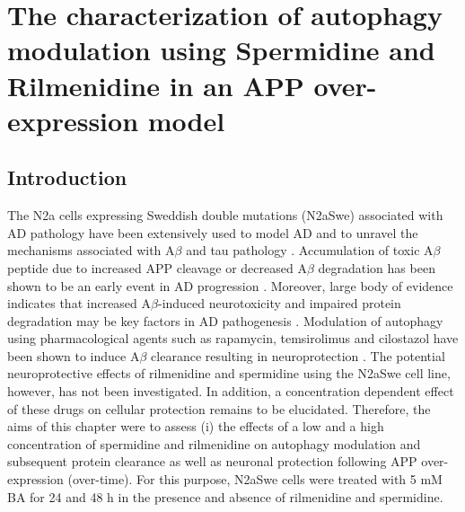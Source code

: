 \chapter{The characterization of autophagy modulation using Spermidine and Rilmenidine in an APP over-expression model }
\label{sec:chapter5}
\section{Introduction}
The N2a cells expressing Sweddish double mutations (N2aSwe) associated with AD pathology have been extensively used to model AD and to unravel the mechanisms associated with A$\beta$ and tau pathology \citep{Kruger2012,Lee2015,Park2011,Schlachetzki2013}. Accumulation of toxic A$\beta$ peptide due to increased APP cleavage or decreased A$\beta$ degradation has been shown to be an early event in AD progression \citep{Selkoe2016}. Moreover, large body of evidence indicates that increased A$\beta$-induced neurotoxicity and impaired protein degradation may be key factors in AD pathogenesis \citep{Selkoe2016}. Modulation of autophagy using pharmacological agents such as rapamycin, temsirolimus and cilostazol have been shown to induce A$\beta$ clearance resulting in neuroprotection \citep{Lee2015,Park2011,Jiang2014a}. The potential neuroprotective effects of rilmenidine and spermidine using the N2aSwe cell line, however, has not been investigated. In addition, a concentration dependent effect of these drugs on cellular protection remains to be elucidated. Therefore, the aims of this chapter were to assess (i) the effects of a low and a high concentration of spermidine and rilmenidine on autophagy modulation and subsequent protein clearance as well as neuronal protection following APP over-expression (over-time). For this purpose, N2aSwe cells were treated with 5 mM BA for 24 and 48 h in the presence and absence of rilmenidine and spermidine.


